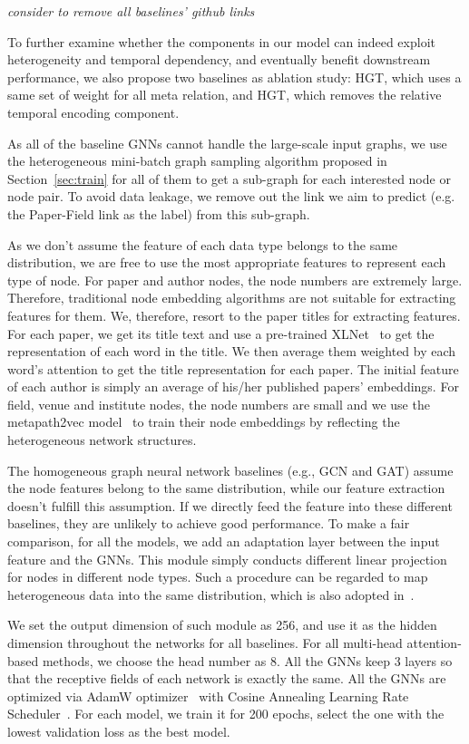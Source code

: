 \documentclass[sigconf]{acmart}
\theoremstyle{definition}
\newcommand{\yd}[1]{\textit{{\color{red}#1 }}}
\begin{document}
{\yd{consider to remove all baselines' github links}



To further examine whether the components in our model can indeed exploit heterogeneity and temporal dependency, and eventually benefit downstream performance, we also propose two baselines as ablation study:  HGT, which uses a same set of weight for all meta relation, and HGT, which removes the relative temporal encoding component. 

As all of the baseline GNNs cannot handle the large-scale input graphs, we use 
the heterogeneous mini-batch graph sampling algorithm proposed in Section~\ref{sec:train} for all of them to get a sub-graph for each interested node or node pair. 
To avoid data leakage, we remove out the link we aim to predict (e.g. the Paper-Field link as the label) from this sub-graph.

As we don't assume the feature of each data type belongs to the same distribution, we are free to use the most appropriate features to represent each type of node. 
For paper and author nodes, the node numbers are extremely large. Therefore, traditional node embedding algorithms are not suitable for extracting features for them. 
We, therefore, resort to the paper titles for extracting features. For each paper, we get its title text and use a pre-trained XLNet~\cite{xlnet, wolf2019transformers} to get the representation of each word in the title. We then average them weighted by each word's attention to get the title representation for each paper. The initial feature of each author is simply an average of his/her published papers' embeddings. For field, venue and institute nodes, the node numbers are small and we use the metapath2vec model~\cite{dong2017metapath2vec} to train their node embeddings by reflecting the heterogeneous network structures. 


The homogeneous graph neural network baselines (e.g., GCN and GAT) assume the node features belong to the same distribution, while our feature extraction doesn't fulfill this assumption. 
If we directly feed the feature into these different baselines, they are unlikely to achieve good performance. 
To make a fair comparison, for all the models, we add an adaptation layer between the input feature and the GNNs. This module simply conducts different linear projection for nodes in different node types. Such a procedure can be regarded to map heterogeneous data into the same distribution, which is also adopted in~\cite{DBLP:conf/kdd/ZhangSHSC19, DBLP:conf/www/WangJSWYCY19}. 

We set the output dimension of such module as 256, and use it as the hidden dimension throughout the networks for all baselines. For all multi-head attention-based methods, we choose the head number as 8. All the GNNs keep 3 layers so that the receptive fields of each network is exactly the same. All the GNNs are optimized via AdamW optimizer~\cite{DBLP:conf/iclr/LoshchilovH19} with Cosine Annealing Learning Rate Scheduler~\cite{DBLP:conf/iclr/LoshchilovH17}. For each model, we train it for 200 epochs, select the one with the lowest validation loss as the best model. 
} 
\end{document}
